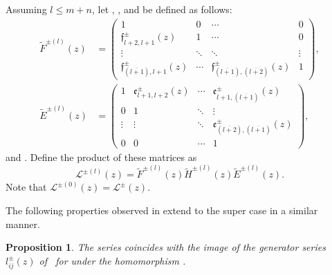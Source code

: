 \documentclass[pdftex]{sigma}
\numberwithin{equation}{section}
\newtheorem{Proposition}[Theorem]{Proposition}
 { \theoremstyle{definition}
\newtheorem{Definition}[Theorem]{Definition}
\newtheorem{Note}[Theorem]{Note}
\newtheorem{Example}[Theorem]{Example}
\newtheorem{Remark}[Theorem]{Remark} }
\begin{document}
Assuming $l\leq m+n$, let , , and  be defined as follows:
\begin{align*}
\widetilde{F}^{\pm (l)}(z) &= \left(
 \begin{matrix}
 1 & 0 & \cdots & 0 \\
 \mathfrak{f}_{l+2,l+1}^{\pm}(z) & 1 & \cdots & 0 \\
 \vdots & \ddots & \ddots & \vdots \\
 \mathfrak{f}_{(\overline{l+1}),l+1}^{\pm}(z) & \cdots & \mathfrak{f}_{(\overline{l+1}),(\overline{l+2})}^{\pm}(z) & 1
 \end{matrix}\right),\\
 \widetilde{E}^{\pm (l)}(z) &= \left(\begin{matrix}
 1 & \mathfrak{e}_{l+1,l+2}^{\pm}(z) & \cdots & \mathfrak{e}_{l+1,(\overline{l+1})}^{\pm}(z) \\
 0 & 1 & \ddots& \vdots \\
 \vdots & \vdots & \ddots &\mathfrak{e}_{(\overline{l+2}),(\overline{l+1})}^{\pm}(z) \\
 0& 0 & \cdots & 1
 \end{matrix}\right),
\end{align*}
and . Define the product of these matrices as
\begin{equation*}
 \mathcal{L}^{\pm (l)}(z)=\widetilde{F}^{\pm (l)}(z)\widetilde{H}^{\pm (l)}(z)\widetilde{E}^{\pm (l)}(z).
\end{equation*}
Note that $ \mathcal{L}^{\pm (0)}(z)=\mathcal{L}^{\pm }(z)$.

The following properties observed in \cite[Proposition 4.2]{JMA} extend to the super case in a similar manner.
\begin{Proposition}\label{pr2}
The series  coincides with the image of the generator series $ l^{\pm }_{ij}(z)$ of~ for  under the homomorphism
.
\end{Proposition}
\end{document}
